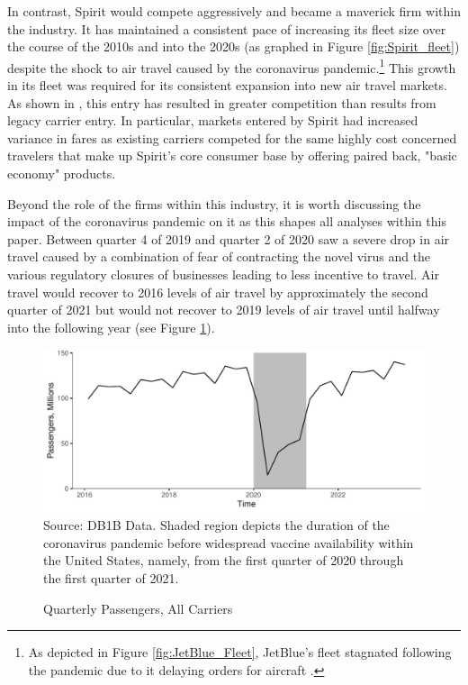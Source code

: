 \documentclass{article}
\begin{document}
	In contrast, Spirit would compete aggressively and became a maverick firm within the industry. It has maintained a consistent pace of increasing its fleet size over the course of the 2010s and into the 2020s (as graphed in Figure \ref{fig:Spirit_fleet}) despite the shock to air travel caused by the coronavirus pandemic.\footnote{As depicted in Figure \ref{fig:JetBlue_Fleet}, JetBlue's fleet stagnated following the pandemic due to it delaying orders for aircraft \citep{bellamy_iii_jetblue_2020, sipinski_jetblue_2020}.} This growth in its fleet was required for its consistent expansion into new air travel markets. As shown in \citet{shrago_spirit_2024}, this entry has resulted in greater competition than results from legacy carrier entry. In particular, markets entered by Spirit had increased variance in fares as existing carriers competed for the same highly cost concerned travelers that make up Spirit's core consumer base by offering paired back, "basic economy" products.
	
	Beyond the role of the firms within this industry, it is worth discussing the impact of the coronavirus pandemic on it as this shapes all analyses within this paper.  Between quarter 4 of 2019 and quarter 2 of 2020 saw a severe drop in air travel caused by a combination of fear of contracting the novel virus and the various regulatory closures of businesses leading to less incentive to travel. Air travel would recover to 2016 levels of air travel by approximately the second quarter of 2021 but would not recover to 2019 levels of air travel until halfway into the following year (see Figure \ref{fig:QuarterlyPass}). 

\begin{figure}
	\caption{Quarterly Passengers, All Carriers}
	\label{fig:QuarterlyPass}
	\includegraphics[width = \linewidth]{Quarterly_DB1B_Itineraries}
	\footnotesize{Source: DB1B Data. Shaded region depicts the duration of the coronavirus pandemic before widespread vaccine availability within the United States, namely, from the first quarter of 2020 through the first quarter of 2021.}
\end{figure}
    
\end{document}
